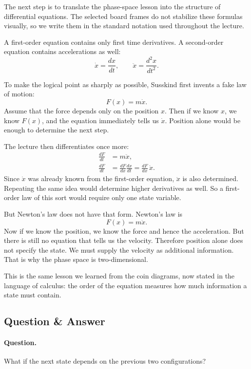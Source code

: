 The next step is to translate the phase-space lesson into the structure of differential equations. The selected board frames do not stabilize these formulas visually, so we write them in the standard notation used throughout the lecture.

A first-order equation contains only first time derivatives. A second-order equation contains accelerations as well:
\[
\dot{x}=\frac{dx}{dt},\qquad \ddot{x}=\frac{d^2x}{dt^2}.
\]

To make the logical point as sharply as possible, Susskind first invents a fake law of motion:
\begin{equation}
F(x)=m\dot{x}.
\end{equation}
Assume that the force depends only on the position \(x\). Then if we know \(x\), we know \(F(x)\), and the equation immediately tells us \(\dot{x}\). Position alone would be enough to determine the next step.

The lecture then differentiates once more:
\begin{align}
\frac{dF}{dt} &= m\ddot{x},\\
\frac{dF}{dt} &= \frac{dF}{dx}\frac{dx}{dt}
              = \frac{dF}{dx}\,\dot{x}.
\end{align}
Since \(\dot{x}\) was already known from the first-order equation, \(\ddot{x}\) is also determined. Repeating the same idea would determine higher derivatives as well. So a first-order law of this sort would require only one state variable.

But Newton's law does not have that form. Newton's law is
\begin{equation}
F(x)=m\ddot{x}.
\end{equation}
Now if we know the position, we know the force and hence the acceleration. But there is still no equation that tells us the velocity. Therefore position alone does not specify the state. We must supply the velocity as additional information. That is why the phase space is two-dimensional.

This is the same lesson we learned from the coin diagrams, now stated in the language of calculus: the order of the equation measures how much information a state must contain.

\subsection{Question \& Answer}

\paragraph{Question.} What if the next state depends on the previous two configurations?

